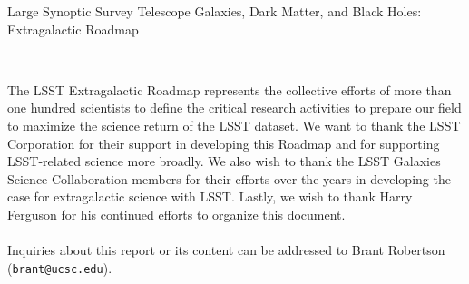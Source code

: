\documentclass[11pt,fleqn]{book} %
\begin{document}




{\Huge Large Synoptic Survey Telescope} 
\linebreak 
\linebreak 
{\Huge Galaxies, Dark Matter, and Black Holes: Extragalactic Roadmap}
\linebreak
\linebreak
{\centering


}
\vfill

\newpage
\thispagestyle{empty}
\noindent
\noindent
\noindent
\\
\noindent

The LSST Extragalactic Roadmap represents the collective efforts of more than one hundred scientists to define the critical research activities to prepare our field to maximize
the science return of the LSST dataset. We want to thank the LSST Corporation for their
support in developing this Roadmap and for supporting LSST-related science more broadly.
We also wish to thank the LSST Galaxies Science Collaboration members for their efforts
over the years in developing the case for extragalactic science with LSST. Lastly, we
wish to thank Harry Ferguson for his continued efforts to organize this document.\\\\
Inquiries about this report or its content can be addressed to Brant Robertson ({\tt brant@ucsc.edu}).









\end{document}

